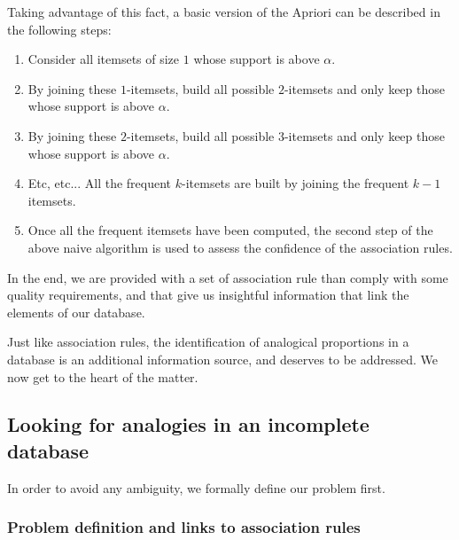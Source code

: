 Taking advantage of this fact, a basic version of the Apriori can be described
in the following steps:
\begin{enumerate}
  \item Consider all itemsets of size $1$ whose support is above $\alpha$.
  \item By joining these $1$-itemsets, build all possible $2$-itemsets and only
    keep those whose support is above $\alpha$.
  \item By joining these $2$-itemsets, build all possible $3$-itemsets and only
    keep those whose support is above $\alpha$.
  \item Etc, etc... All the frequent $k$-itemsets are built by joining the
    frequent $k-1$ itemsets.
  \item Once all the frequent itemsets have been computed, the second step of
    the above naive algorithm is used to assess the confidence of the
    association rules.
\end{enumerate}

In the end, we are provided with a set of association rule than comply with
some quality requirements, and that give us insightful information that link
the elements of our database.


Just like association rules, the identification of analogical proportions in a
database is an additional information source, and deserves to be addressed. We
now get to the heart of the matter.

\subsection{Looking for analogies in an incomplete database}

In order to avoid any ambiguity, we formally define our problem first. 
\subsubsection{Problem definition and links to association rules}

